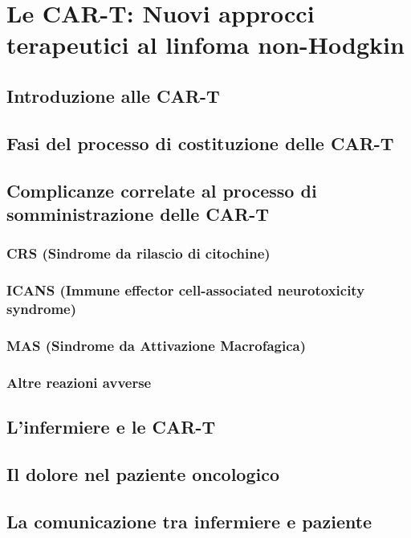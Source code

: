 \chapter{Le CAR-T: Nuovi approcci terapeutici al linfoma non-Hodgkin}

\section{Introduzione alle CAR-T}

\section{Fasi del processo di costituzione delle CAR-T}

\section{Complicanze correlate al processo di somministrazione delle CAR-T}

\subsection{CRS (Sindrome da rilascio di citochine)}
\subsection{ICANS (Immune effector cell-associated neurotoxicity syndrome)}
\subsection{MAS (Sindrome da Attivazione Macrofagica)}
\subsection{Altre reazioni avverse}

\section{L’infermiere e le CAR-T}

\section{Il dolore nel paziente oncologico}

\section{La comunicazione tra infermiere e paziente}
